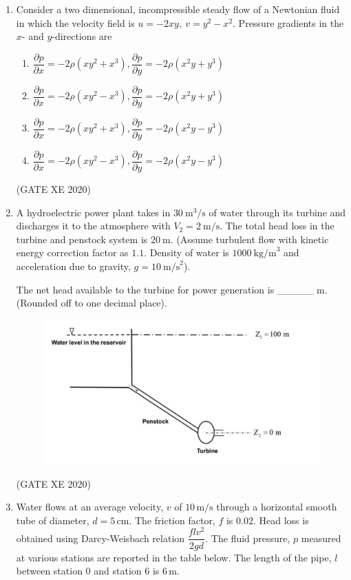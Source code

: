 \documentclass[12pt]{article}
\begin{document}
\begin{enumerate}
\item Consider a two dimensional, incompressible steady flow of a Newtonian fluid in which the velocity field is $u = -2xy, \ v = y^2 - x^2$.  
Pressure gradients in the $x$- and $y$-directions are

\begin{enumerate}
\item $\dfrac{\partial p}{\partial x} = -2\rho(xy^2 + x^3),
       \dfrac{\partial p}{\partial y} = -2\rho(x^2 y + y^3)$
\item $\dfrac{\partial p}{\partial x} = -2\rho(xy^2 - x^3),
       \dfrac{\partial p}{\partial y} = -2\rho(x^2 y + y^3)$
\item $\dfrac{\partial p}{\partial x} = -2\rho(xy^2 + x^3),  
       \dfrac{\partial p}{\partial y} = -2\rho(x^2y - y^3)$
\item $\dfrac{\partial p}{\partial x} = -2\rho(xy^2 - x^3), 
       \dfrac{\partial p}{\partial y} = -2\rho(x^2y - y^3)$
\end{enumerate}
(GATE XE 2020)

\item A hydroelectric power plant takes in $30 \ \text{m}^3/\text{s}$ of water through its turbine and discharges it to the atmosphere with $V_2 = 2 \ \text{m/s}$.  
The total head loss in the turbine and penstock system is $20 \ \text{m}$.  
(Assume turbulent flow with kinetic energy correction factor as $1.1$.  
Density of water is $1000 \ \text{kg/m}^3$ and acceleration due to gravity, $g = 10 \ \text{m/s}^2$).  

The net head available to the turbine for power generation is \_\_\_\_\_ m.  
(Rounded off to one decimal place).

\begin{figure}[H]
    \centering
    \includegraphics[width=0.5\columnwidth]{figs/ass4_b_q15.png}
    \caption{}
    \label{fig:placeholder}
\end{figure}
(GATE XE 2020)

\item Water flows at an average velocity, $v$ of $10 \, \text{m/s}$ through a horizontal smooth tube of diameter, $d = 5 \, \text{cm}$. The friction factor, $f$ is $0.02$. Head loss is obtained using Darcy-Weisbach relation $\dfrac{flv^2}{2gd}$. The fluid pressure, $p$ measured at various stations are reported in the table below. The length of the pipe, $l$ between station 0 and station 6 is $6 \, \text{m}$.


\end{enumerate}
\end{document}
